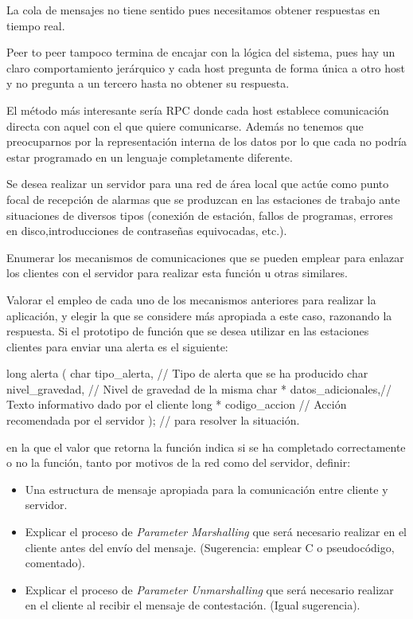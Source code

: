 \begin{problem}[12]
\spart

La cola de mensajes no tiene sentido pues necesitamos obtener respuestas en tiempo real.

Peer to peer tampoco termina de encajar con la lógica del sistema, pues hay un claro comportamiento jerárquico y cada host pregunta de forma única a otro host y no pregunta a un tercero hasta no obtener su respuesta.

El método más interesante sería RPC donde cada host establece comunicación directa con aquel con el que quiere comunicarse. Además no tenemos que preocuparnos por la representación interna de los datos por lo que cada no podría estar programado en un lenguaje completamente diferente.

\end{problem}


  \begin{problem}[13]
  Se desea realizar un servidor para una red de área local que actúe como
punto focal de recepción de alarmas que se produzcan en las estaciones de
trabajo ante situaciones de diversos tipos (conexión de estación, fallos de
programas, errores en disco,introducciones de contraseñas equivocadas, etc.).

    \ppart Enumerar los mecanismos de comunicaciones que se pueden emplear para
enlazar los clientes con el servidor para realizar esta función u otras
similares.

    \ppart Valorar el empleo de cada uno de los mecanismos anteriores para realizar la
aplicación, y elegir la que se considere más apropiada a este caso, razonando
la respuesta.
    \ppart Si el prototipo de función que se desea utilizar en las estaciones clientes
para enviar una alerta es el siguiente:
\begin{verbnobox}[\small]
long alerta (
char tipo_alerta,      // Tipo de alerta que se ha producido
char nivel_gravedad,   // Nivel de gravedad de la misma
char * datos_adicionales,// Texto informativo dado por el cliente
long * codigo_accion   // Acción recomendada por el servidor
);                     //  para resolver la situación.
\end{verbnobox}
    en la que el valor que retorna la función indica si se ha completado
correctamente o no la función, tanto por motivos de la red como del servidor,
definir:
    \begin{itemize}
      \item Una estructura de mensaje apropiada para la comunicación entre cliente y
servidor.
      \item Explicar el proceso de \textit{Parameter Marshalling} que será necesario
realizar en el cliente antes del envío del mensaje. (Sugerencia: emplear C o
pseudocódigo, comentado).
      \item Explicar el proceso de \textit{Parameter Unmarshalling} que será necesario
realizar en el cliente al recibir el mensaje de contestación. (Igual sugerencia).
    \end{itemize}
      \solution


\end{problem}
